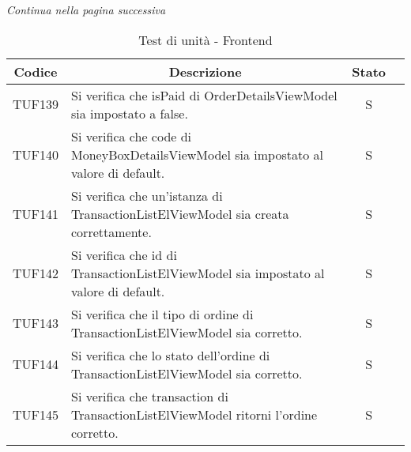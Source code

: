 \begin{center}
  \textit{\small Continua nella pagina successiva}
\end{center}
\begin{table}[H]
  \centering
  \renewcommand{\arraystretch}{1.8}
  \begin{tabular}{c|p{8cm}|c|c}
    \rowcolor[HTML]{125E28}
    \color[HTML]{FFFFFF}\textbf{Codice}
          & \multicolumn{1}{c}{\color[HTML]{FFFFFF}\textbf{Descrizione}}
          & \color[HTML]{FFFFFF}\textbf{Stato}                                                                                                          \\
    \hline
    TUF139 & Si verifica che isPaid di OrderDetailsViewModel sia impostato a false. & S \\
    TUF140 & Si verifica che code di MoneyBoxDetailsViewModel sia impostato al valore di default. & S \\
    TUF141 & Si verifica che un'istanza di TransactionListElViewModel sia creata correttamente. & S \\
    TUF142 & Si verifica che id di TransactionListElViewModel sia impostato al valore di default. & S \\
    TUF143 & Si verifica che il tipo di ordine di TransactionListElViewModel sia corretto. & S \\
    TUF144 & Si verifica che lo stato dell'ordine di TransactionListElViewModel sia corretto. & S \\
    TUF145 & Si verifica che transaction di TransactionListElViewModel ritorni l'ordine corretto. & S \\
  \end{tabular}
  \caption{Test di unità - Frontend}
\end{table}

